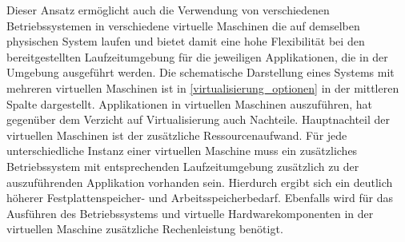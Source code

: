  Dieser Ansatz ermöglicht auch die Verwendung von verschiedenen Betriebssystemen in verschiedene virtuelle Maschinen die auf demselben physischen System laufen und bietet damit eine hohe Flexibilität bei den bereitgestellten Laufzeitumgebung für die jeweiligen Applikationen, die in der Umgebung ausgeführt werden. Die schematische Darstellung eines Systems mit mehreren virtuellen Maschinen ist in \autoref{virtualisierung_optionen} in der mittleren Spalte dargestellt. Applikationen in virtuellen Maschinen auszuführen, hat gegenüber dem Verzicht auf Virtualisierung auch Nachteile. Hauptnachteil der virtuellen Maschinen ist der zusätzliche Ressourcenaufwand. Für jede unterschiedliche Instanz einer virtuellen Maschine muss ein zusätzliches Betriebssystem mit entsprechenden Laufzeitumgebung zusätzlich zu der auszuführenden Applikation vorhanden sein. Hierdurch ergibt sich ein deutlich höherer Festplattenspeicher- und Arbeitsspeicherbedarf. Ebenfalls wird für das Ausführen des Betriebssystems und virtuelle Hardwarekomponenten in der virtuellen Maschine zusätzliche Rechenleistung benötigt. \cite{Mavridis2019} 

